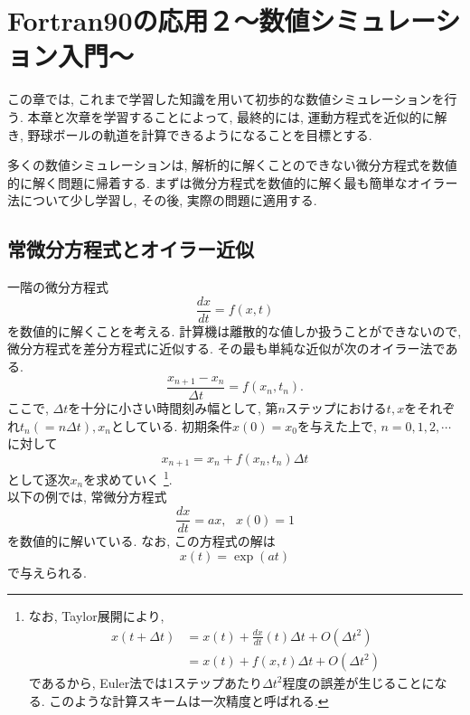 \chapter{Fortran90の応用２〜数値シミュレーション入門〜}

この章では, これまで学習した知識を用いて初歩的な数値シミュレーションを行う. 
本章と次章を学習することによって, 最終的には, 運動方程式を近似的に解き, 
野球ボールの軌道を計算できるようになることを目標とする. 

多くの数値シミュレーションは, 
解析的に解くことのできない微分方程式を数値的に解く問題に帰着する. 
まずは微分方程式を数値的に解く最も簡単なオイラー法について少し学習し, 
その後, 実際の問題に適用する. 


\section{常微分方程式とオイラー近似}
一階の微分方程式
\begin{equation}
\frac{dx}{dt}=f(x,t)
\end{equation}
を数値的に解くことを考える.
計算機は離散的な値しか扱うことができないので, 微分方程式を差分方程式に近似する.
その最も単純な近似が次のオイラー法である.
\begin{equation}
\frac{x_{n+1}-x_{n}}{\Delta t}=f(x_n,t_n).
\end{equation}
ここで, $\Delta t$を十分に小さい時間刻み幅として,
第$n$ステップにおける$t, x$をそれぞれ$t_n(=n \Delta t), x_n$としている.
初期条件$x(0)=x_0$を与えた上で, $n=0, 1, 2, \cdots$に対して
\begin{equation}
x_{n+1}=x_{n}+f(x_n,t_n)\Delta t
\end{equation}
として逐次$x_n$を求めていく
\footnote
{なお, Taylor展開により,
\begin{equation}
\begin{split}
x(t+\Delta t)&=x(t)+\frac{dx}{dt}(t)\Delta t+O(\Delta t^2)\\
&=x(t)+f(x,t)\Delta t+O(\Delta t^2)
\end{split}
\end{equation}
であるから, Euler法では1ステップあたり$\Delta t^2$程度の誤差が生じることになる. 
このような計算スキームは一次精度と呼ばれる. }. \\

以下の例では, 常微分方程式
\begin{equation}
\frac{dx}{dt}=ax, \ \ \ x(0)=1
\end{equation}
を数値的に解いている.
なお, この方程式の解は
\begin{equation}
x(t)=\exp(at)
\end{equation}
で与えられる.

